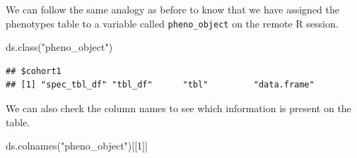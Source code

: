 \documentclass[
]{book}
\newenvironment{Shaded}{\begin{snugshade}}{\end{snugshade}}
\newcommand{\DecValTok}[1]{\textcolor[rgb]{0.00,0.00,0.81}{#1}}
\newcommand{\FunctionTok}[1]{\textcolor[rgb]{0.00,0.00,0.00}{#1}}
\newcommand{\NormalTok}[1]{#1}
\newcommand{\StringTok}[1]{\textcolor[rgb]{0.31,0.60,0.02}{#1}}
\begin{document}
We can follow the same analogy as before to know that we have assigned the phenotypes table to a variable called \texttt{pheno\_object} on the remote R session.

\begin{Shaded}
\begin{Highlighting}[]
\FunctionTok{ds.class}\NormalTok{(}\StringTok{"pheno\_object"}\NormalTok{)}
\end{Highlighting}
\end{Shaded}

\begin{verbatim}
## $cohort1
## [1] "spec_tbl_df" "tbl_df"      "tbl"         "data.frame"
\end{verbatim}

We can also check the column names to see which information is present on the table.

\begin{Shaded}
\begin{Highlighting}[]
\FunctionTok{ds.colnames}\NormalTok{(}\StringTok{"pheno\_object"}\NormalTok{)[[}\DecValTok{1}\NormalTok{]]}
\end{Highlighting}
\end{Shaded}
\end{document}
